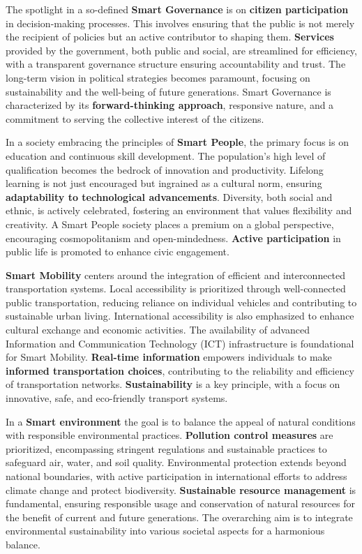  
The spotlight in a so-defined \textbf{Smart Governance} is on \textbf{citizen participation} in decision-making processes. This involves ensuring that the public is not merely the recipient of policies but an active contributor to shaping them. \textbf{Services} provided by the government, both public and social, are streamlined for efficiency, with a transparent governance structure ensuring accountability and trust.
The long-term vision in political strategies becomes paramount, focusing on sustainability and the well-being of future generations. Smart Governance is characterized by its \textbf{forward-thinking approach}, responsive nature, and a commitment to serving the collective interest of the citizens.


  In a society embracing the principles of \textbf{Smart People}, the primary focus is on education and continuous skill development. The population's high level of qualification becomes the bedrock of innovation and productivity. Lifelong learning is not just encouraged but ingrained as a cultural norm, ensuring \textbf{adaptability to technological advancements}. Diversity, both social and ethnic, is actively celebrated, fostering an environment that values flexibility and creativity. A Smart People society places a premium on a global perspective, encouraging cosmopolitanism and open-mindedness. \textbf{Active participation} in public life is promoted to enhance civic engagement.

    
  \textbf{Smart Mobility} centers around the integration of efficient and interconnected transportation systems. Local accessibility is prioritized through well-connected public transportation, reducing reliance on individual vehicles and contributing to sustainable urban living. International accessibility is also emphasized to enhance cultural exchange and economic activities.
The availability of advanced Information and Communication Technology (ICT) infrastructure is foundational for Smart Mobility. \textbf{Real-time information} empowers individuals to make \textbf{informed transportation choices}, contributing to the reliability and efficiency of transportation networks. \textbf{Sustainability} is a key principle, with a focus on innovative, safe, and eco-friendly transport systems.

 
In a \textbf{Smart environment} the goal is to balance the appeal of natural conditions with responsible environmental practices. \textbf{Pollution control measures} are prioritized, encompassing stringent regulations and sustainable practices to safeguard air, water, and soil quality.
Environmental protection extends beyond national boundaries, with active participation in international efforts to address climate change and protect biodiversity. \textbf{Sustainable resource management} is fundamental, ensuring responsible usage and conservation of natural resources for the benefit of current and future generations. The overarching aim is to integrate environmental sustainability into various societal aspects for a harmonious balance.
    
